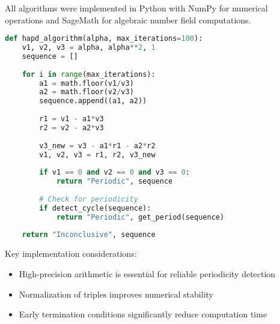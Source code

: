 All algorithms were implemented in Python with NumPy for numerical operations and SageMath for algebraic number field computations.

\begin{lstlisting}[language=Python, caption=Basic implementation of HAPD algorithm]
def hapd_algorithm(alpha, max_iterations=100):
    v1, v2, v3 = alpha, alpha**2, 1
    sequence = []
    
    for i in range(max_iterations):
        a1 = math.floor(v1/v3)
        a2 = math.floor(v2/v3)
        sequence.append((a1, a2))
        
        r1 = v1 - a1*v3
        r2 = v2 - a2*v3
        
        v3_new = v3 - a1*r1 - a2*r2
        v1, v2, v3 = r1, r2, v3_new
        
        if v1 == 0 and v2 == 0 and v3 == 0:
            return "Periodic", sequence
            
        # Check for periodicity
        if detect_cycle(sequence):
            return "Periodic", get_period(sequence)
            
    return "Inconclusive", sequence
\end{lstlisting}

Key implementation considerations:
\begin{itemize}
    \item High-precision arithmetic is essential for reliable periodicity detection
    \item Normalization of triples improves numerical stability
    \item Early termination conditions significantly reduce computation time
\end{itemize} 